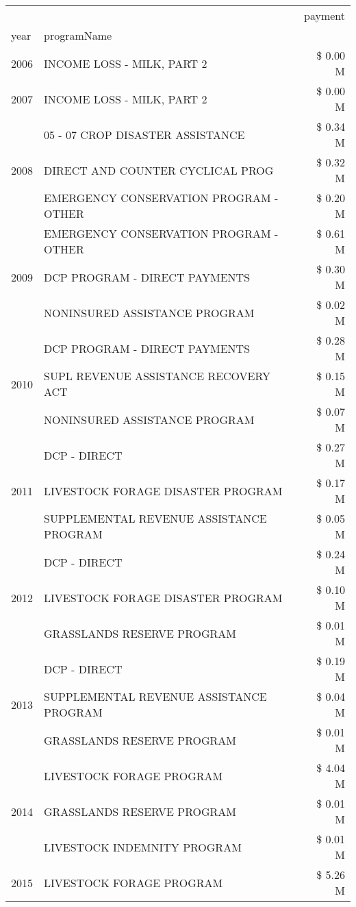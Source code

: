 \begin{tabular}{llr}
\toprule
 &  & payment \\
year & programName &  \\
\midrule
2006 & INCOME LOSS - MILK, PART 2 & \$ 0.00 M \\
\cline{1-3}
2007 & INCOME LOSS - MILK, PART 2 & \$ 0.00 M \\
\cline{1-3}
\multirow[t]{3}{*}{2008} & 05 - 07 CROP DISASTER ASSISTANCE & \$ 0.34 M \\
 & DIRECT AND COUNTER CYCLICAL PROG & \$ 0.32 M \\
 & EMERGENCY CONSERVATION PROGRAM - OTHER & \$ 0.20 M \\
\cline{1-3}
\multirow[t]{3}{*}{2009} & EMERGENCY CONSERVATION PROGRAM - OTHER & \$ 0.61 M \\
 & DCP PROGRAM - DIRECT PAYMENTS & \$ 0.30 M \\
 & NONINSURED ASSISTANCE PROGRAM & \$ 0.02 M \\
\cline{1-3}
\multirow[t]{3}{*}{2010} & DCP PROGRAM - DIRECT PAYMENTS & \$ 0.28 M \\
 & SUPL REVENUE ASSISTANCE RECOVERY ACT & \$ 0.15 M \\
 & NONINSURED ASSISTANCE PROGRAM & \$ 0.07 M \\
\cline{1-3}
\multirow[t]{3}{*}{2011} & DCP - DIRECT & \$ 0.27 M \\
 & LIVESTOCK FORAGE DISASTER PROGRAM & \$ 0.17 M \\
 & SUPPLEMENTAL REVENUE ASSISTANCE PROGRAM & \$ 0.05 M \\
\cline{1-3}
\multirow[t]{3}{*}{2012} & DCP - DIRECT & \$ 0.24 M \\
 & LIVESTOCK FORAGE DISASTER PROGRAM & \$ 0.10 M \\
 & GRASSLANDS RESERVE PROGRAM & \$ 0.01 M \\
\cline{1-3}
\multirow[t]{3}{*}{2013} & DCP - DIRECT & \$ 0.19 M \\
 & SUPPLEMENTAL REVENUE ASSISTANCE PROGRAM & \$ 0.04 M \\
 & GRASSLANDS RESERVE PROGRAM & \$ 0.01 M \\
\cline{1-3}
\multirow[t]{3}{*}{2014} & LIVESTOCK FORAGE PROGRAM & \$ 4.04 M \\
 & GRASSLANDS RESERVE PROGRAM & \$ 0.01 M \\
 & LIVESTOCK INDEMNITY PROGRAM & \$ 0.01 M \\
\cline{1-3}
\multirow[t]{3}{*}{2015} & LIVESTOCK FORAGE PROGRAM & \$ 5.26 M \\

\end{tabular}

